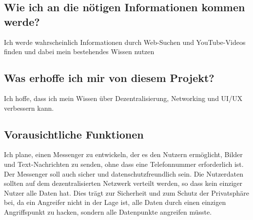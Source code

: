 \subsection{Wie ich an die nötigen Informationen kommen werde?}
Ich werde wahrscheinlich Informationen durch Web-Suchen und YouTube-Videos finden und dabei mein bestehendes Wissen nutzen
\subsection{Was erhoffe ich mir von diesem Projekt?}
Ich hoffe, dass ich mein Wissen über Dezentralisierung, Networking und UI/UX verbessern kann.
\subsection{Vorausichtliche Funktionen}
Ich plane, einen Messenger zu entwickeln, der es den Nutzern ermöglicht, Bilder und Text-Nachrichten zu senden, ohne dass eine Telefonnummer erforderlich ist. 
Der Messenger soll auch sicher und datenschutzfreundlich sein. Die Nutzerdaten sollten auf dem dezentralisierten Netzwerk verteilt werden, so dass kein einziger Nutzer alle Daten hat. Dies trägt zur Sicherheit und zum Schutz der Privatsphäre bei, da ein Angreifer nicht in der Lage ist, alle Daten durch einen einzigen Angriffspunkt zu hacken, sondern alle Datenpunkte angreifen müsste.